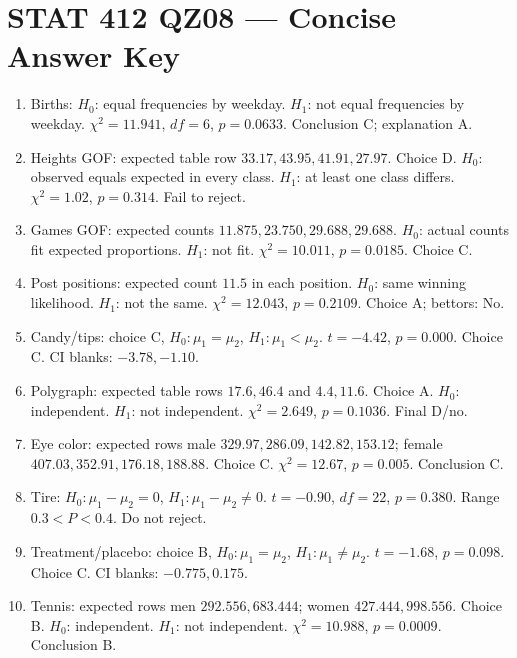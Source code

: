 \documentclass[11pt]{article}
\begin{document}
\sloppy
\section*{STAT 412 QZ08 --- Concise Answer Key}
\begin{enumerate}[label=\textbf{\arabic*.}]
\item Births: \(H_0\): equal frequencies by weekday. \(H_1\): not equal frequencies by weekday. \(\chi^2=11.941\), \(df=6\), \(p=0.0633\). Conclusion C; explanation A.
\item Heights GOF: expected table row \(33.17,43.95,41.91,27.97\). Choice D. \(H_0\): observed equals expected in every class. \(H_1\): at least one class differs. \(\chi^2=1.02\), \(p=0.314\). Fail to reject.
\item Games GOF: expected counts \(11.875,23.750,29.688,29.688\). \(H_0\): actual counts fit expected proportions. \(H_1\): not fit. \(\chi^2=10.011\), \(p=0.0185\). Choice C.
\item Post positions: expected count \(11.5\) in each position. \(H_0\): same winning likelihood. \(H_1\): not the same. \(\chi^2=12.043\), \(p=0.2109\). Choice A; bettors: No.
\item Candy/tips: choice C, \(H_0:\mu_1=\mu_2\), \(H_1:\mu_1<\mu_2\). \(t=-4.42\), \(p=0.000\). Choice C. CI blanks: \(-3.78,-1.10\).
\item Polygraph: expected table rows \(17.6,46.4\) and \(4.4,11.6\). Choice A. \(H_0\): independent. \(H_1\): not independent. \(\chi^2=2.649\), \(p=0.1036\). Final D/no.
\item Eye color: expected rows male \(329.97,286.09,142.82,153.12\); female \(407.03,352.91,176.18,188.88\). Choice C. \(\chi^2=12.67\), \(p=0.005\). Conclusion C.
\item Tire: \(H_0:\mu_1-\mu_2=0\), \(H_1:\mu_1-\mu_2\ne0\). \(t=-0.90\), \(df=22\), \(p=0.380\). Range \(0.3<P<0.4\). Do not reject.
\item Treatment/placebo: choice B, \(H_0:\mu_1=\mu_2\), \(H_1:\mu_1\ne\mu_2\). \(t=-1.68\), \(p=0.098\). Choice C. CI blanks: \(-0.775,0.175\).
\item Tennis: expected rows men \(292.556,683.444\); women \(427.444,998.556\). Choice B. \(H_0\): independent. \(H_1\): not independent. \(\chi^2=10.988\), \(p=0.0009\). Conclusion B.
\end{enumerate}
\end{document}
